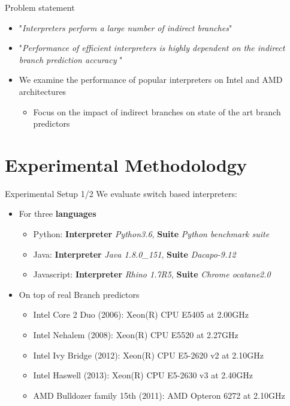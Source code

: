\documentclass[10pt]{beamer}
\begin{document}
\begin{frame}{Problem statement}
    \begin{itemize}
    	\item{"\textit{Interpreters perform a large number of indirect branches}"} \footnotemark
        \item{"\textit{Performance of efficient interpreters is highly dependent on the indirect branch prediction accuracy }"} \footnotemark[1]
        \item{We examine the performance of popular interpreters on Intel and AMD architectures}
	         \begin{itemize}
	         	\item {Focus on the impact of indirect branches on state of the art branch predictors }
	         \end{itemize}
    \end{itemize}
    
\end{frame}

\section{Experimental Methodolodgy}
\begin{frame}{Experimental Setup 1/2}
	We evaluate switch based interpreters:
	\begin{itemize}
		\item {For three \textbf{languages}}
			\begin{itemize}
				\item {Python: \textbf{Interpreter} \textit{Python3.6}, \textbf{Suite} \textit{Python benchmark suite\footnotemark[2]}} 
				\item {Java: \textbf{Interpreter} \textit{Java 1.8.0\_151}, \textbf{Suite} \textit{Dacapo-9.12}} 
				\item {Javascript: \textbf{Interpreter} \textit{Rhino 1.7R5}, \textbf{Suite} \textit{Chrome ocatane2.0}}
			\end{itemize}
		\item {On top of real Branch predictors}
		\begin{itemize}
			\item {Intel Core 2 Duo (2006): Xeon(R) CPU E5405 at 2.00GHz} 
			\item {Intel Nehalem (2008): Xeon(R) CPU E5520 at 2.27GHz} 
			\item {Intel Ivy Bridge (2012): Xeon(R) CPU E5-2620 v2 at 2.10GHz} 
			\item {Intel Haswell (2013): Xeon(R) CPU E5-2630 v3 at 2.40GHz} 
			\item {AMD Bulldozer family 15th (2011): AMD Opteron 6272 at 2.10GHz}
		\end{itemize}
		
	\end{itemize}
\end{frame}
\end{document}
